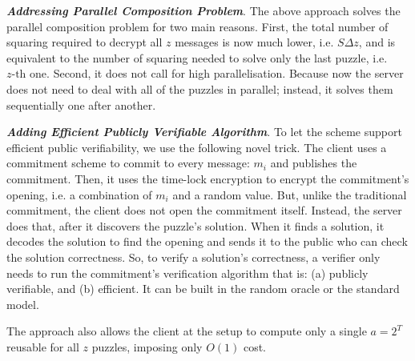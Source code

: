   
  
  \noindent\textit{\textbf{Addressing Parallel Composition Problem}}.  The above approach solves the parallel composition problem for two main reasons.  First, the total  number of squaring required to decrypt all $z$ messages is now much lower, i.e. $S \Delta z$, and is equivalent to the number of squaring needed to solve only the last puzzle,  i.e. $z\text{-th}$ one. Second, it does not call for  high parallelisation. Because now the server does not need to deal with all of the puzzles in parallel; instead, it solves them sequentially one after another.  
  
  
  
  \noindent\textit{\textbf{Adding Efficient Publicly Verifiable Algorithm}}. To let the  scheme  support  efficient public verifiability, we use the following novel trick. The client uses a commitment scheme to commit to every message: $m_{\scriptscriptstyle i}$ and publishes the  commitment. Then, it uses the time-lock encryption to encrypt the commitment's opening, i.e. a combination of $m_{\scriptscriptstyle i}$ and a random value. But, unlike the traditional commitment, the client does not open the commitment itself. Instead, the server does that, after it discovers the puzzle's solution.  When it finds a solution, it decodes the solution to find the opening and sends it to the public who can check the solution correctness. So, to verify  a solution's correctness,   a verifier  only needs to run the commitment's verification algorithm that is: (a)  publicly verifiable, and (b)   efficient. It can be built in the random oracle  or  the standard model.
  
    The approach also allows  the client at the setup to compute only a single $a=2^{\scriptscriptstyle T}$  reusable for all $z$ puzzles, imposing only $O(1)$  cost. 

\vspace{-3mm}

